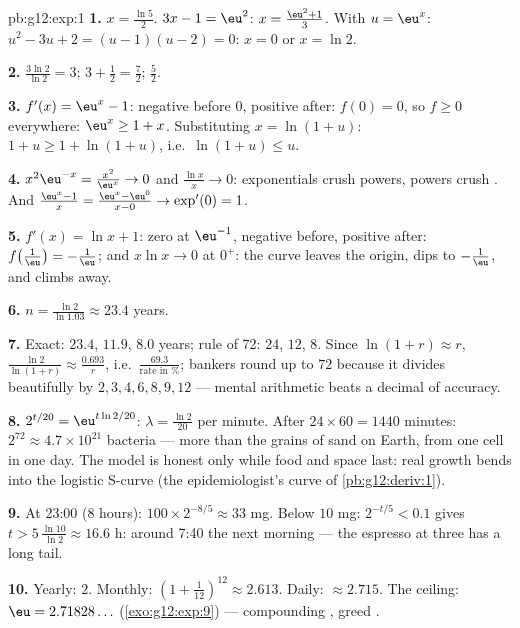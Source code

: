\begin{solution}{pb:g12:exp:1}
\textbf{1.} $x = \frac{\ln 5}{2}$. \quad
$3x - 1 = \eu^2$: $x = \frac{\eu^2 + 1}{3}$. \quad With
$u = \eu^x$: $u^2 - 3u + 2 = (u - 1)(u - 2) = 0$: $x = 0$ or
$x = \ln 2$.

\textbf{2.} $\frac{3\ln 2}{\ln 2} = 3$; \quad
$3 + \frac12 = \frac72$; \quad $\frac52$.

\textbf{3.} $f'(x) = \eu^x - 1$: negative before $0$, positive
after:  $f(0) = 0$, so $f \geq 0$ everywhere:
$\eu^x \geq 1 + x$. Substituting $x = \ln(1 + u)$:
$1 + u \geq 1 + \ln(1 + u)$, i.e.\ $\ln(1 + u) \leq u$.

\textbf{4.} $x^2\eu^{-x} = \frac{x^2}{\eu^x} \to 0$ and
$\frac{\ln x}{x} \to 0$: exponentials crush powers, powers
crush . And $\frac{\eu^x - 1}{x} =
\frac{\eu^x - \eu^0}{x - 0} \to \exp'(0) = 1$.

\textbf{5.} $f'(x) = \ln x + 1$: zero at $\eu^{-1}$, negative
before, positive after: 
$f\!\left(\frac1\eu\right) = -\frac1\eu$; and
$x \ln x \to 0$ at $0^+$: the curve leaves the origin, dips to
$-\frac1\eu$, and climbs away.

\textbf{6.} $n = \frac{\ln 2}{\ln 1.03} \approx 23.4$ years.

\textbf{7.} Exact: $23.4$, $11.9$, $8.0$ years; rule of 72:
$24$, $12$, $8$. Since $\ln(1+r) \approx r$,
$\frac{\ln 2}{\ln(1+r)} \approx \frac{0.693}{r}$, i.e.\
$\frac{69.3}{\text{rate in }\%}$; bankers round up to $72$
because it divides beautifully by $2, 3, 4, 6, 8, 9, 12$ ---
mental arithmetic beats a decimal of accuracy.

\textbf{8.} $2^{t/20} = \eu^{t \ln 2 / 20}$:
$\lambda = \frac{\ln 2}{20}$ per minute. After
$24 \times 60 = 1440$ minutes: $2^{72} \approx 4.7 \times
10^{21}$ bacteria --- more than the grains of sand on Earth,
from one cell in one day. The model is honest only while food
and space last: real growth bends into the logistic S-curve
(the epidemiologist's curve of \cref{pb:g12:deriv:1}).

\textbf{9.} At 23:00 ($8$ hours):
$100 \times 2^{-8/5} \approx 33$ mg. Below $10$ mg:
$2^{-t/5} < 0.1$ gives $t > 5\,\frac{\ln 10}{\ln 2} \approx
16.6$ h: around 7:40 the next morning --- the espresso at
three has a long tail.

\textbf{10.} Yearly: $2$. Monthly:
$\left(1 + \frac{1}{12}\right)^{12} \approx 2.613$. Daily:
$\approx 2.715$. The ceiling: $\eu = 2.71828\ldots$
(\cref{exo:g12:exp:9}) --- compounding , greed
\omterm{def:g12:seq:limit}{converges}.


\end{solution}
